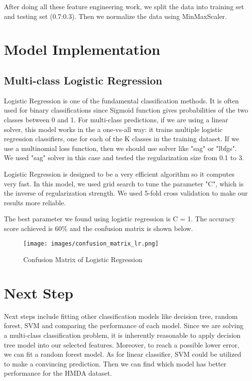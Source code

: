 \documentclass[letterpaper, 10 pt, conference]{ieeeconf}  %
\begin{document}
After doing all these feature engineering work, we split the data into training set and testing set (0.7:0.3). Then we normalize the data using MinMaxScaler. 

\section{Model Implementation}

\subsection{Multi-class Logistic Regression}
Logistic Regression is one of the fundamental classification methods. It is often used for binary classifications since Sigmoid function gives probabilities of the two classes between 0 and 1. For multi-class predictions, if we are using a linear solver, this model works in the a one-vs-all way: it trains multiple logistic regression classifiers, one for each of the K classes in the training dataset. If we use a multinomial loss function, then we should use solver like "sag" or "lbfgs". We used "sag" solver in this case and tested the regularization size from 0.1 to 3.

Logistic Regression is designed to be a very efficient algorithm so it computes very fast. In this model, we used grid search to tune the parameter "C", which is the inverse of regularization strength. We used 5-fold cross validation to make our results more reliable.

The best parameter we found using logistic regression is C = 1. The accuracy score achieved is 60\% and the confusion matrix is shown below.

\begin{figure}[H]
    \centering
    \texttt{[image: images/confusion\_matrix\_lr.png]}
    \caption{Confusion Matrix of Logistic Regression}
\end{figure}

\section{Next Step}
Next steps include fitting other classification models like decision tree, random forest, SVM and comparing the performance of each model. Since we are solving a multi-class classification problem, it is inherently reasonable to apply decision tree model into our selected features. Moreover, to reach a possible lower error, we can fit a random forest model. As for linear classifier, SVM could be utilized to make a convincing prediction. Then we can find which model has better performance for the HMDA dataset. 
\end{document}
